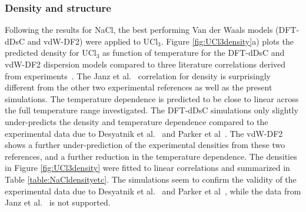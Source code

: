 \documentclass[preprint,3p,10pt,onecolumn,number,sort&compress]{elsarticle}
\begin{document}
{\subsubsection{Density and structure}
Following the results for NaCl, the best performing Van der Waals models (DFT-dDsC and vdW-DF2) were applied to UCl$_3$. Figure \ref{fig:UCl3density}a) plots the predicted density for UCl$_3$ as function of temperature for the DFT-dDsC and vdW-DF2 dispersion models compared to three literature correlations derived from experiments~\cite{Janz1988,Desyatnik,Parker}. The Janz et al.~\cite{Janz1988} correlation for density is surprisingly different from the other two experimental references as well as the present simulations.  The temperature dependence is predicted to be close to linear across the full temperature range investigated. The DFT-dDsC simulations only slightly under-predicts the density and temperature dependence compared to the experimental data due to Desyatnik et al.~\cite{Desyatnik} and Parker et al~\cite{Parker}. The vdW-DF2 shows a further under-prediction of the experimental densities from these two references, and a further reduction in the temperature dependence. The densities in Figure \ref{fig:UCl3density} were fitted to linear correlations and summarized in Table \ref{table:NaCldensityetc}. The simulations seem to confirm the validity of the experimental data due to Desyatnik et al.~\cite{Desyatnik} and Parker et al~\cite{Parker}, while the data from Janz et al.~\cite{Janz1988} is not supported.



 
}
\end{document}
